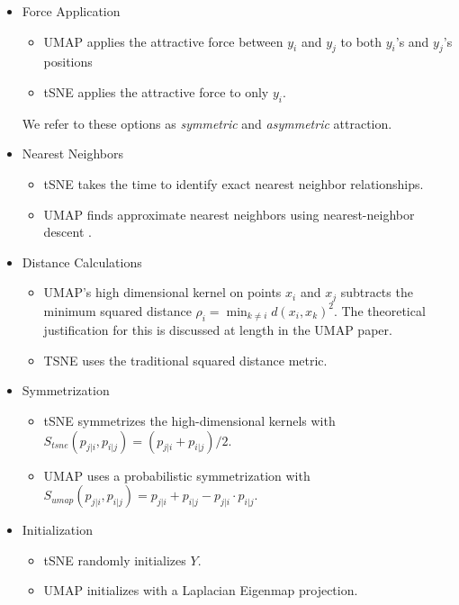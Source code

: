 \documentclass[sigconf, nonacm]{acmart}
\begin{document}
\begin{itemize}
    \item Force Application
        \begin{itemize}
        \item UMAP applies the attractive force between $y_i$ and $y_j$ to both $y_i$'s and $y_j$'s positions
        \item tSNE applies the attractive force to only $y_i$.
        \end{itemize}
        We refer to these options as \textit{symmetric} and \textit{asymmetric} attraction.

    \item Nearest Neighbors
        \begin{itemize}
        \item tSNE takes the time to identify exact nearest neighbor relationships.
        \item UMAP finds approximate nearest neighbors using nearest-neighbor descent \cite{dong2011efficient}.
        \end{itemize}

    \item Distance Calculations
        \begin{itemize}
        \item UMAP's high dimensional kernel on points $x_i$ and $x_j$ subtracts the minimum squared distance $\rho_i = \min_{k \neq i} d(x_i, x_k)^2$. The theoretical
        justification for this is discussed at length in the UMAP paper. 
        \item TSNE uses the traditional squared distance metric.
        \end{itemize}

    \item Symmetrization
        \begin{itemize}
        \item tSNE symmetrizes the high-dimensional kernels with $S_{tsne}(p_{j|i}, p_{i|j}) = (p_{j|i} + p_{i|j}) / 2$.
        \item UMAP uses a probabilistic symmetrization with $S_{umap}(p_{j|i}, p_{i|j}) = p_{j|i} + p_{i|j} - p_{j|i} \cdot p_{i|j}$.
        \end{itemize}

    \item Initialization
        \begin{itemize}
        \item tSNE randomly initializes $Y$.
        \item UMAP initializes with a Laplacian Eigenmap projection.
        \end{itemize}

\end{itemize}
\end{document}
